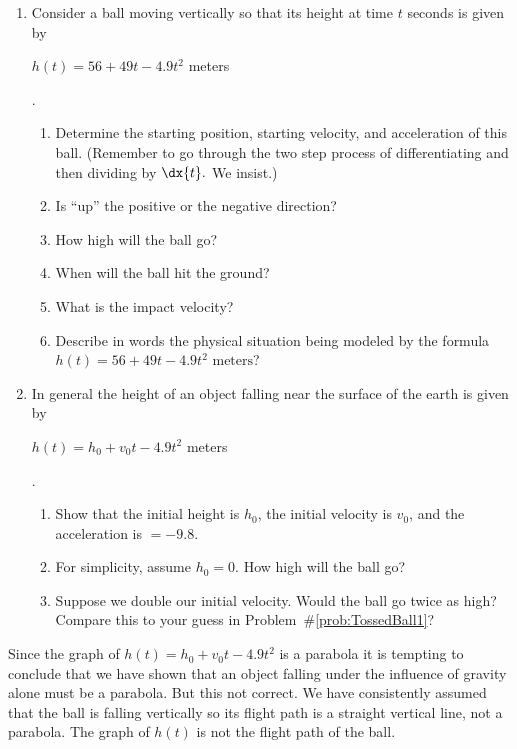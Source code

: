   \begin{embeddedproblem-enumerate}
    \begin{enumerate}[label={\bf{}(\alph*)}]
    \item     Consider a ball moving vertically so that its height at time $t$
      seconds is given by\\
      \centerline{$
      h(t) = 56+49t-4.9t^2$ meters}.
      \begin{enumerate}[label={\bf{}(\roman*)}]
      \item Determine the starting position, starting velocity, and
        acceleration of this ball.  (Remember to go through the two step
        process of differentiating and then dividing by $\dx{t}.$ We
        insist.)
      \item Is ``up'' the positive or the negative direction?
      \item How high will the ball go?
      \item When will the ball hit the ground?
      \item What is the impact velocity?
      \item Describe in words the physical situation being modeled by the
        formula $ h(t) = 56+49t-4.9t^2 \text{ meters}$?
      \end{enumerate}
    \item
      In  general the height of an object falling near the surface of
      the earth is given by \\
      \centerline{$
      h(t)=h_0+v_0t-4.9t^2$ meters}.
      \begin{enumerate}[label={\bf{}(\roman*)}]
      \item Show that the initial height is $h_0$, the initial velocity
        is $v_0$, and the acceleration is $=-9.8$.
      \item For simplicity, assume $h_0=0$.  How high will the ball go?
      \item Suppose we double our initial velocity.  Would the ball go
        twice as high?  Compare this to your guess in
        Problem~\#\ref{prob:TossedBall1}?
      \end{enumerate}
      \vskip-6mm{}
    \end{enumerate}
  \end{embeddedproblem-enumerate}
    
Since the graph of $h(t)=h_0+v_0t-4.9t^2$ is a parabola it is tempting to
conclude that we have shown that an object falling under the influence
of gravity alone must be a parabola. But this not correct. We have
consistently assumed that the ball is falling vertically so its flight
path is a straight vertical line, not a parabola. The graph of $h(t)$
is not the flight path of the ball.

